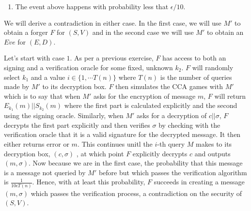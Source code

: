 \documentclass{article}
\begin{document}
\begin{enumerate}[,start=2]
\begin{enumerate}[,label=\alph*.]
\begin{mdbmarginx}{1ex}{0pt}{1ex}{0pt}
\begin{enumerate}[noitemsep,topsep=\mdcompacttopsep]
\item{}The event above happens with probability less that $\epsilon /10$.%
\end{enumerate}%

\noindent{}We will derive a contradiction in either case. In the first case, we will use $M'$ to obtain
a forger $F$ for $(S,V)$ and in the second case we will use $M'$ to obtain an $Eve$ for $(E,D)$.%

Let's start with case $1$. As per a previous exercise, $F$ has access to both an signing and a 
verification oracle for some fixed, unknown $k_2$. $F$ will randomly select $k_1$ and a value
$i \in \{1, \cdots T(n)\}$ where $T(n)$ is the number of queries made by $M'$ to its decryption box.
$F$ then simulates the CCA games with $M'$ which is to say that when $M'$ asks for the encryption
of message $m$, $F$ will return $E_{k_1}(m) || S_{k_2}(m)$ where the first part is calculated
explicitly and the second using the signing oracle. Similarly, when $M'$ asks for a decryption
of $c || \sigma$, $F$ decrypts the first part explicitly and then verifies $\sigma$ by checking
with the verification oracle that it is a valid signature for the decrypted message. It then either
returns error or $m$. This continues unitl the $i$-th query $M$ makes to its decryption box, $(c,\sigma)$
, at which point $F$ explicitly decrypts $c$ and outputs $(m,\sigma)$. Now because we are in the first case, the probability 
that this message is a message not queried by $M'$ before but which passes the verification 
algorithm is $\frac{1}{10\epsilon T(n)}$. Hence, with at least this probability, $F$ succeeds in 
creating a message $(m,\sigma)$ which passes the verification process, a contradiction
on the security of $(S,V)$.%


\end{mdbmarginx}
\end{enumerate}
\end{enumerate}
\end{document}
